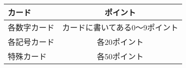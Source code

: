 \documentclass[11pt]{ltjsarticle}
\begin{document}
\begin{table}[h]
  \begin{center}
    \begin{tabular}{|l|c|} \hline
      カード & ポイント \\ \hline \hline
      各数字カード & カードに書いてある0～9ポイント \\
      各記号カード & 各20ポイント \\
      特殊カード & 各50ポイント \\ \hline
    \end{tabular}
    \label{tab:カードポイント}
  \end{center}
\end{table}
\end{document}

